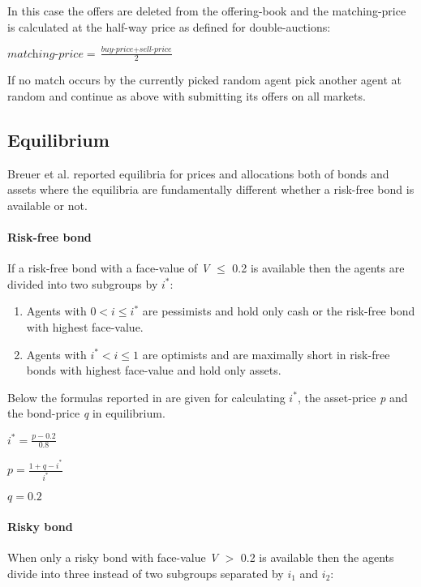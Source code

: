 \documentclass[../Bachelorarbeit.tex]{subfiles}
\begin{document}
In this case the offers are deleted from the offering-book and the matching-price is calculated at the half-way price as defined for double-auctions:
\begin{center}
$\textit{matching-price} = \frac{\textit{buy-price} + \textit{sell-price}}{2}$
\end{center}

If no match occurs by the currently picked random agent pick another agent at random and continue as above with submitting its offers on all markets.

\subsection{Equilibrium}
Breuer et al. reported equilibria for prices and allocations both of bonds and assets where the equilibria are fundamentally different whether a risk-free bond is available or not.

\paragraph{Risk-free bond}
If a risk-free bond with a face-value of \textit{V} $\leq$ 0.2 is available then the agents are divided into two subgroups by $i^*$:

\begin{enumerate}
\item Agents with $0 < i \leq i^*$ are pessimists and hold only cash or the risk-free bond with highest face-value.
\item Agents with $i^* < i \leq 1$ are optimists and are maximally short in risk-free bonds with highest face-value and hold only assets.
\end{enumerate}

Below the formulas reported in \cite{Breuer2015} are given for calculating $i^*$, the asset-price \textit{p} and the bond-price \textit{q} in equilibrium.

\begin{center}
$i^* = \frac{p - 0.2}{0.8}$
\end{center}

\begin{center}
$p = \frac{1 + q - i^*}{i^*}$
\end{center}

\begin{center}
$q = 0.2$
\end{center}

\paragraph{Risky bond}
When only a risky bond with face-value \textit{V} $>$ 0.2 is available then the agents divide into three instead of two subgroups separated by $i_{1}$ and $i_{2}$:
\end{document}
